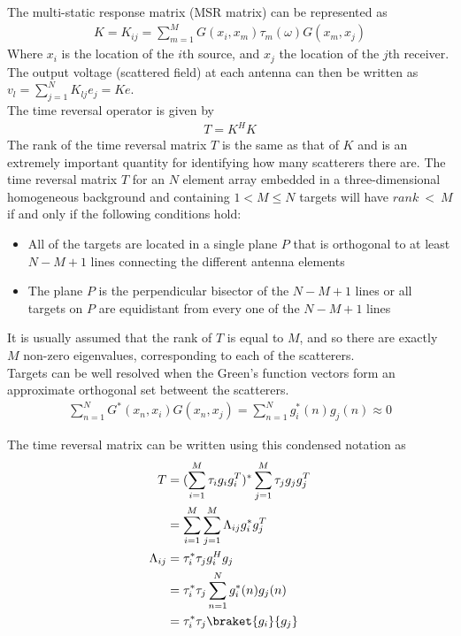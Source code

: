 \documentclass[14pt]{article}
\begin{document}
	The multi-static response matrix (MSR matrix) can be represented as
	\begin{align}
		K = K_{ij} = \sum_{m=1}^M G(x_i,x_m)\tau_m(\omega)G(x_m,x_j)
	\end{align}
	Where $x_i$ is the location of the $i$th source, and $x_j$ the location of the
	$j$th receiver.
	The output voltage (scattered field) at each antenna can then be written as
	$v_l = \sum_{j=1}^N K_{lj}e_j = K e$.~\\
	
	The time reversal operator is given by
	\begin{align}
		T = K^H K
	\end{align}
	The rank of the time reversal matrix $T$ is the same as that of $K$ and is
	an extremely important quantity for identifying how many scatterers there are.
	The time reversal matrix $T$ for an $N$ element array embedded in a 
	three-dimensional homogeneous background and containing $1 < M \le N$ targets
	will have $rank~<~M$ if and only if the following conditions hold:
		\begin{itemize}
			\item	All of the targets are located in a single plane $P$ that is orthogonal
			to at least $N - M + 1$ lines connecting the different antenna elements
			\item	The plane $P$ is the perpendicular bisector of the $N - M + 1$ lines
			or all targets on $P$ are equidistant from every one of the $N - M + 1$ lines
		\end{itemize}
	
	It is usually assumed that the rank of $T$ is equal to $M$, and so there are
	exactly $M$ non-zero eigenvalues, corresponding to each of the scatterers.~\\

	Targets can be well resolved when the Green's function vectors form an 
	approximate orthogonal set betweent the scatterers.
	\begin{align}
		\sum_{n=1}^N G^*(x_n,x_i)G(x_n,x_j) = \sum_{n=1}^N g_i^*(n) g_j(n) \approx 0
	\end{align}
	
	The time reversal matrix can be written using this condensed notation as
	\begin{align}
		T &= (\sum_{i=1}^M \tau_i g_ig_i^T)^*\sum_{j=1}^M \tau_j g_jg_j^T \\
			&=	\sum_{i=1}^M\sum_{j=1}^M \Lambda_{ij}g_i^*g_j^T \\
		\Lambda_{ij} &= \tau_i^* \tau_j g_i^Hg_j \\
								 &= \tau_i^* \tau_j \sum_{n=1}^N g_i^*(n)g_j(n) \\
								 &= \tau_i^* \tau_j \braket{g_i}{g_j} 
	\end{align}
\end{document}
